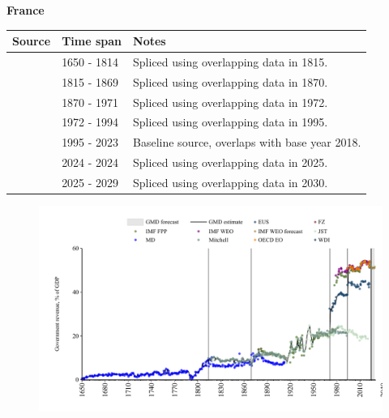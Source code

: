 \documentclass[12pt,a4paper,landscape]{article}
\begin{document}
\begin{adjustbox}{max totalsize={\paperwidth}{\paperheight},center}
\begin{minipage}[t][\textheight][t]{\textwidth}
\vspace*{0.5cm}
{}
\begin{center}
{\Large\bfseries France}
\end{center}
\vspace{0.5cm}
\begin{table}[H]
\centering
\small
\begin{tabular}{|l|l|l|}
\hline
\textbf{Source} & \textbf{Time span} & \textbf{Notes} \\
\hline
\rowcolor{white}\cite{MD}& 1650 - 1814 &Spliced using overlapping data in 1815.\\
\rowcolor{lightgray}\cite{Mitchell}& 1815 - 1869 &Spliced using overlapping data in 1870.\\
\rowcolor{white}\cite{JST}& 1870 - 1971 &Spliced using overlapping data in 1972.\\
\rowcolor{lightgray}\cite{WDI}& 1972 - 1994 &Spliced using overlapping data in 1995.\\
\rowcolor{white}\cite{OECD_EO}& 1995 - 2023 &Baseline source, overlaps with base year 2018.\\
\rowcolor{lightgray}\cite{EUS}& 2024 - 2024 &Spliced using overlapping data in 2025.\\
\rowcolor{white}\cite{IMF_WEO_forecast}& 2025 - 2029 &Spliced using overlapping data in 2030.\\
\hline
\end{tabular}
\end{table}
\begin{figure}[H]
\centering
\includegraphics[width=\textwidth,height=0.6\textheight,keepaspectratio]{graphs/FRA_govrev_GDP.pdf}
\end{figure}
\end{minipage}
\end{adjustbox}
\end{document}
